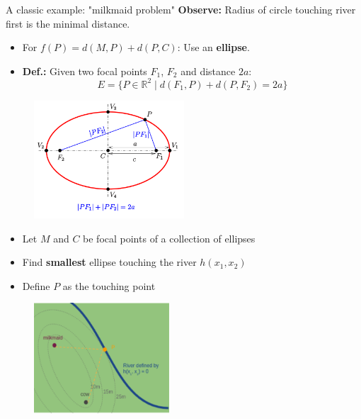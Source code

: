 \documentclass[11pt,compress,t,notes=noshow, xcolor=table]{beamer}
\begin{document}
\begin{vbframe}{A classic example: "milkmaid problem"}
\textbf{Observe:} Radius of circle touching river first is the minimal distance.

\framebreak 

\begin{itemize}
    \item For $f(P) = d(M,P) + d(P,C)$: Use an \textbf{ellipse}.
    \item \textbf{Def.:} Given two focal points $F_1$, $F_2$ and distance $2a$:
        \begin{equation*}
            E = \{ P \in \mathbb{R}^2 \;|\; d(F_1,P) + d(P,F_2) = 2a \}
        \end{equation*}
\end{itemize}

\medskip

\begin{figure}
    \centering
	\includegraphics[width=0.5\textwidth]{figure_man/ellipse.png}
\end{figure}

\framebreak 


\begin{itemize}
    \item Let $M$ and $C$ be focal points of a collection of ellipses
    \item Find \textbf{smallest} ellipse touching the river $h(x_1, x_2)$
    \item Define $P$ as the touching point
\end{itemize}

\vspace*{0.5\baselineskip}

\begin{figure}
    \centering
	\includegraphics[width=0.45\textwidth]{figure_man/milkmaid4.png}
\end{figure}


\end{vbframe}
\end{document}

